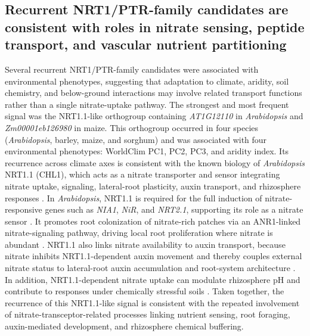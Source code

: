 \documentclass[unnumsec,webpdf,contemporary,large]{oup-authoring-template}%
\theoremstyle{thmstyleone}%
\theoremstyle{thmstyletwo}%
\theoremstyle{thmstylethree}%
\begin{document}

\subsection{Recurrent NRT1/PTR-family candidates are consistent with roles in nitrate sensing, peptide transport, and vascular nutrient partitioning}

Several recurrent NRT1/PTR-family candidates were associated with environmental phenotypes, suggesting that adaptation to climate, aridity, soil chemistry, and below-ground interactions may involve related transport functions rather than a single nitrate-uptake pathway. The strongest and most frequent signal was the NRT1.1-like orthogroup containing \textit{AT1G12110} in \textit{Arabidopsis} and \textit{Zm00001eb126980} in maize. This orthogroup occurred in four species (\textit{Arabidopsis}, barley, maize, and sorghum) and was associated with four environmental phenotypes: WorldClim PC1, PC2, PC3, and aridity index. Its recurrence across climate axes is consistent with the known biology of \textit{Arabidopsis} NRT1.1 (CHL1), which acts as a nitrate transporter and sensor integrating nitrate uptake, signaling, lateral-root plasticity, auxin transport, and rhizosphere responses \citep{Wang2009NRT11,Glass2013NRT11,Krouk2010NRT11Auxin}. In \textit{Arabidopsis}, NRT1.1 is required for the full induction of nitrate-responsive genes such as \textit{NIA1}, \textit{NiR}, and \textit{NRT2.1}, supporting its role as a nitrate sensor \citep{Wang2009NRT11}. It promotes root colonization of nitrate-rich patches via an ANR1-linked nitrate-signaling pathway, driving local root proliferation where nitrate is abundant \citep{Remans2006NRT11Patch}. NRT1.1 also links nitrate availability to auxin transport, because nitrate inhibits NRT1.1-dependent auxin movement and thereby couples external nitrate status to lateral-root auxin accumulation and root-system architecture \citep{Krouk2010NRT11Auxin}. In addition, NRT1.1-dependent nitrate uptake can modulate rhizosphere pH and contribute to responses under chemically stressful soils \citep{Fang2016NRT11Proton,Hachiya2011NRT11LowpH,Zhu2019NRT11Lead}. Taken together, the recurrence of this NRT1.1-like signal is consistent with the repeated involvement of nitrate-transceptor-related processes linking nutrient sensing, root foraging, auxin-mediated development, and rhizosphere chemical buffering.
\end{document}
